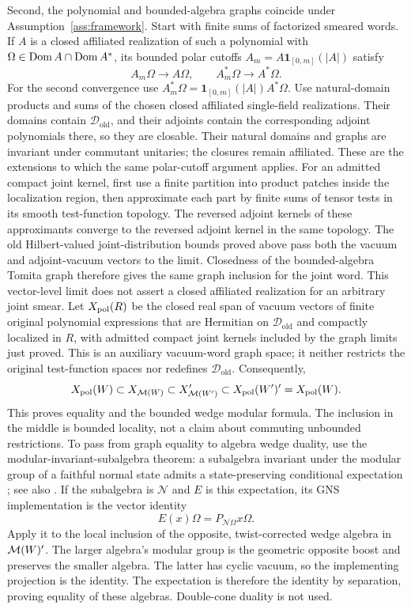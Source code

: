 Second, the polynomial and bounded-algebra graphs coincide under
Assumption~\ref{ass:framework}. Start with finite sums of factorized
smeared words. If $A$ is a closed affiliated realization of such a
polynomial with $\Omega\in\operatorname{Dom} A\cap\operatorname{Dom} A^*$, its bounded polar
cutoffs $A_m=A\mathbf1_{[0,m]}(|A|)$ satisfy
\[
 A_m\Omega\longrightarrow A\Omega,\qquad
 A_m^*\Omega\longrightarrow A^*\Omega.
\]
For the second convergence use
$A_m^*\Omega=\mathbf1_{[0,m]}(|A|)A^*\Omega$.
Use natural-domain products and sums of the chosen closed affiliated
single-field realizations. Their domains contain $\mathcal D_{\mathrm{old}}$,
and their adjoints contain the corresponding adjoint polynomials there,
so they are closable. Their natural domains and graphs are invariant
under commutant unitaries; the closures remain affiliated. These are
the extensions to which the same polar-cutoff argument applies.
For an admitted compact joint kernel, first use a finite partition into
product patches inside the localization region, then approximate each part
by finite sums of tensor tests in its smooth test-function topology. The
reversed adjoint kernels of these approximants converge to the reversed
adjoint kernel in the same topology. The old Hilbert-valued
joint-distribution bounds proved above pass both the vacuum and
adjoint-vacuum vectors to the limit. Closedness of the bounded-algebra
Tomita graph therefore gives the same graph inclusion for the joint word.
This vector-level limit does not assert a closed affiliated realization for
an arbitrary joint smear.
Let $X_{\rm pol}(R)$ be the closed real span of vacuum vectors of finite
original polynomial expressions that are Hermitian on
$\mathcal D_{\mathrm{old}}$ and compactly localized in $R$, with
admitted compact joint kernels included by the graph limits just proved.
This is an auxiliary vacuum-word graph space; it neither restricts the
original test-function spaces nor redefines $\mathcal D_{\mathrm{old}}$.
Consequently,
\begin{equation}\label{F:BW-sandwich}
 X_{\rm pol}(W)\subset X_{\mathcal M(W)}
 \subset X_{\mathcal M(W')}^{\prime}
 \subset X_{\rm pol}(W')^{\prime}=X_{\rm pol}(W).
\end{equation}
This proves equality and the bounded wedge modular formula. The
inclusion in the middle is bounded locality, not a claim about commuting
unbounded restrictions. To pass from graph equality to algebra wedge
duality, use the modular-invariant-subalgebra theorem: a subalgebra
invariant under the modular group of a faithful normal state admits a
state-preserving conditional expectation \cite{Takesaki1972}; see also
\cite[Theorems~3.5 and~5.2]{AccardiCecchini1982}. If the subalgebra is
$\mathcal N$ and $E$ is this expectation, its GNS implementation is the
vector identity
\[
 E(x)\Omega=P_{\overline{\mathcal N\Omega}}x\Omega.
\]
Apply it to the local inclusion of the
opposite, twist-corrected wedge algebra in $\mathcal M(W)'$. The larger
algebra's modular group is the geometric opposite boost and preserves
the smaller algebra. The latter has cyclic vacuum, so the implementing
projection is the identity. The expectation is therefore the identity
by separation, proving equality of these algebras. Double-cone duality
is not used.

